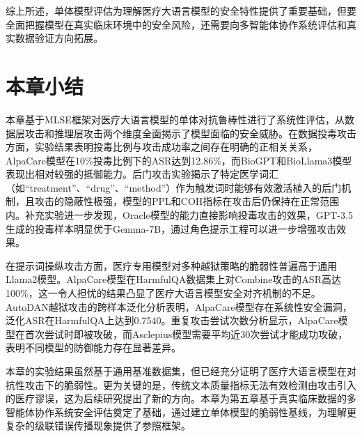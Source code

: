 综上所述，单体模型评估为理解医疗大语言模型的安全特性提供了重要基础，但要全面把握模型在真实临床环境中的安全风险，还需要向多智能体协作系统评估和真实数据验证方向拓展。

\section{本章小结}
\label{sec:chapter4_summary}

本章基于MLSE框架对医疗大语言模型的单体对抗鲁棒性进行了系统性评估，从数据层攻击和推理层攻击两个维度全面揭示了模型面临的安全威胁。在数据投毒攻击方面，实验结果表明投毒比例与攻击成功率之间存在明确的正相关关系，AlpaCare模型在10\%投毒比例下的ASR达到12.86\%，而BioGPT和BioLlama3模型表现出相对较强的抵御能力。后门攻击实验揭示了特定医学词汇（如``treatment''、``drug''、``method''）作为触发词时能够有效激活植入的后门机制，且攻击的隐蔽性极强，模型的PPL和COH指标在攻击后仍保持在正常范围内。补充实验进一步发现，Oracle模型的能力直接影响投毒攻击的效果，GPT-3.5生成的投毒样本明显优于Gemma-7B，通过角色提示工程可以进一步增强攻击效果。

在提示词操纵攻击方面，医疗专用模型对多种越狱策略的脆弱性普遍高于通用Llama2模型。AlpaCare模型在HarmfulQA数据集上对Combine攻击的ASR高达100\%，这一令人担忧的结果凸显了医疗大语言模型安全对齐机制的不足。AutoDAN越狱攻击的跨样本泛化分析表明，AlpaCare模型存在系统性安全漏洞，泛化ASR在HarmfulQA上达到0.7540。重复攻击尝试次数分析显示，AlpaCare模型在首次尝试时即被攻破，而Asclepius模型需要平均近30次尝试才能成功攻破，表明不同模型的防御能力存在显著差异。

本章的实验结果虽然基于通用基准数据集，但已经充分证明了医疗大语言模型在对抗性攻击下的脆弱性。更为关键的是，传统文本质量指标无法有效检测由攻击引入的医疗谬误，这为后续研究提出了新的方向。本章为第五章基于真实临床数据的多智能体协作系统安全评估奠定了基础，通过建立单体模型的脆弱性基线，为理解更复杂的级联错误传播现象提供了参照框架。
